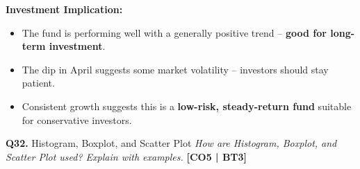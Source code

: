 \documentclass[12pt,a4paper]{article}
\newcommand{\Qno}[1]{\textbf{\color{darkred}Q#1.}}
\begin{document}
\begin{answerenv}
\textbf{\color{headingcolor}Investment Implication:}
\begin{itemize}[leftmargin=1.5em]
  \item The fund is performing well with a generally positive trend -- \textbf{good for long-term investment}.
  \item The dip in April suggests some market volatility -- investors should stay patient.
  \item Consistent growth suggests this is a \textbf{low-risk, steady-return fund} suitable for conservative investors.
\end{itemize}

\end{answerenv}

\vspace{8pt}

\begin{questionbox}{\Qno{32} Histogram, Boxplot, and Scatter Plot}
\textit{How are Histogram, Boxplot, and Scatter Plot used? Explain with examples.} \hfill \textbf{[CO5 | BT3]}
\end{questionbox}
\end{document}
